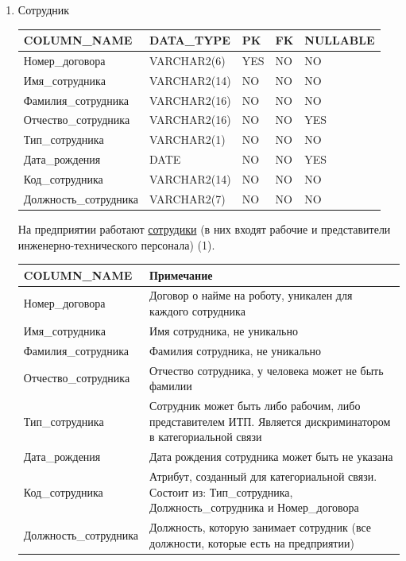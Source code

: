 \begin{enumerate}
    \item{Сотрудник}

    \begin{tabular}{|p{7cm}|p{3cm}|p{1cm}|p{1cm}|p{3cm}|} \hline

        {\bf COLUMN\_NAME} & {\bf DATA\_TYPE} & {\bf PK} & {\bf FK} & {\bf NULLABLE} \\ \hline
        Номер\_договора & VARCHAR2(6) & YES & NO & NO \\ \hline
        Имя\_сотрудника & VARCHAR2(14) & NO & NO & NO \\ \hline
        Фамилия\_сотрудника & VARCHAR2(16) & NO & NO & NO \\ \hline
        Отчество\_сотрудника & VARCHAR2(16) & NO & NO & YES \\ \hline
        Тип\_сотрудника & VARCHAR2(1) & NO & NO & NO \\ \hline
        Дата\_рождения & DATE & NO & NO & YES \\ \hline
        Код\_сотрудника & VARCHAR2(14) & NO & NO & NO \\ \hline
        Должность\_сотрудника & VARCHAR2(7) & NO & NO & NO \\ \hline

    \end{tabular}

    На предприятии работают \underline{сотрудики} (в них входят рабочие и представители инженерно-технического персонала) (1).

    \begin{tabular}{|p{7cm}|p{9.3cm}|} \hline

        {\bf COLUMN\_NAME} & {\bf Примечание} \\ \hline
        Номер\_договора &  Договор о найме на роботу, уникален для каждого сотрудника \\ \hline
        Имя\_сотрудника &  Имя сотрудника, не уникально \\ \hline
        Фамилия\_сотрудника & Фамилия сотрудника, не уникально \\ \hline
        Отчество\_сотрудника & Отчество сотрудника, у человека может не быть фамилии \\ \hline
        Тип\_сотрудника & Сотрудник может быть либо рабочим, либо представителем ИТП. Является дискриминатором в категориальной связи \\ \hline
        Дата\_рождения & Дата рождения сотрудника может быть не указана \\ \hline
        Код\_сотрудника & Атрибут, созданный для категориальной связи. Состоит из: Тип\_сотрудника, Должность\_сотрудника и Номер\_договора \\ \hline
        Должность\_сотрудника & Должность, которую занимает сотрудник (все должности, которые есть на предприятии) \\ \hline


\end{tabular}
\end{enumerate}
